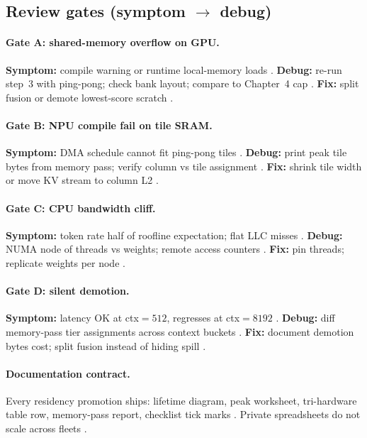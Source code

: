 \subsection{Review gates (symptom $\rightarrow$ debug)}
\paragraph{Gate A: shared-memory overflow on GPU.}
\textbf{Symptom:} compile warning or runtime local-memory loads \citep{memoryfloor2026,nvidia2022hopper}.
\textbf{Debug:} re-run step~3 with ping-pong; check bank layout; compare to Chapter~4 cap \citep{semianalysis2024tma,yirage2026}.
\textbf{Fix:} split fusion or demote lowest-score scratch \citep{wu2024mirage,chen2020compilerbasedhardw}.

\paragraph{Gate B: NPU compile fail on tile SRAM.}
\textbf{Symptom:} DMA schedule cannot fit ping-pong tiles \citep{amd2024xdna,amd2024aie}.
\textbf{Debug:} print peak tile bytes from memory pass; verify column vs tile assignment \citep{yirage2026,patel2025llminference}.
\textbf{Fix:} shrink tile width or move KV stream to column L2 \citep{amd2024aie,dao2023flashdecoding}.

\paragraph{Gate C: CPU bandwidth cliff.}
\textbf{Symptom:} token rate half of roofline expectation; flat LLC misses \citep{patel2025llminference,memoryfloor2026}.
\textbf{Debug:} NUMA node of threads vs weights; remote access counters \citep{dlbook}.
\textbf{Fix:} pin threads; replicate weights per node \citep{kwon2023vllm,taxbreak2026}.

\paragraph{Gate D: silent demotion.}
\textbf{Symptom:} latency OK at ctx${=}512$, regresses at ctx${=}8192$ \citep{patel2025llminference,dao2023flashdecoding}.
\textbf{Debug:} diff memory-pass tier assignments across context buckets \citep{yirage2026,amd2024xdna}.
\textbf{Fix:} document demotion bytes cost; split fusion instead of hiding spill \citep{memoryfloor2026,chen2020compilerbasedhardw}.

\paragraph{Documentation contract.}
Every residency promotion ships: lifetime diagram, peak worksheet, tri-hardware table row, memory-pass report, checklist tick marks \citep{yirage2026,chen2020compilerbasedhardw,patel2025llminference,taxbreak2026,memoryfloor2026}.
Private spreadsheets do not scale across fleets \citep{patel2025llminference}.

